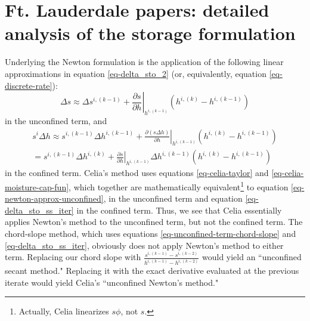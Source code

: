 \documentclass[fleqn]{article}
\begin{document}
\section{Ft. Lauderdale papers: detailed analysis of the storage formulation}
Underlying the Newton formulation is the application of the following linear approximations in equation \ref{eq-delta_sto_2} (or, equivalently,
equation \ref{eq-discrete-rate}):
\begin{equation}
  \Delta s \approx \Delta s^{i,(k-1)} +
  \left. \frac{\partial s}{\partial h}\right|_{h^{i,(k-1)}}
  \left ( h^{i,(k)} - h^{i,(k-1)} \right )
  \label{eq-newton-approx-unconfined}
\end{equation}
in the unconfined term, and
\begin{equation}
  \begin{split}
    s^{i} \Delta h \approx s^{i,(k-1)} \Delta h^{i,(k-1)} +
    \left. \frac{\partial \left ( s \Delta h \right )}{\partial h}\right|_{h^{i,(k-1)}}
    \left ( h^{i,(k)} - h^{i,(k-1)} \right )\\
    = s^{i,(k-1)} \Delta h^{i,(k)} +
    \left. \frac{\partial s}{\partial h}\right|_{h^{i,(k-1)}}
    \Delta h^{i,(k-1)} \left ( h^{i,(k)} - h^{i,(k-1)} \right )
  \end{split}
  \label{eq-newton-approx-confined}
\end{equation}
in the confined term. Celia's method uses equations \ref{eq-celia-taylor} and \ref{eq-celia-moisture-cap-fun}, which together are mathematically equivalent\footnote{{\color{purple}Actually, Celia linearizes $s \phi$, not $s$.}} to equation \ref{eq-newton-approx-unconfined}, in the unconfined term and equation \ref{eq-delta_sto_ss_iter} in the confined term. Thus, we see that Celia essentially applies Newton's method to the unconfined term, but not the confined term. The chord-slope method, which uses equations \ref{eq-unconfined-term-chord-slope} and \ref{eq-delta_sto_ss_iter}, obviously does not apply Newton's method to either term. Replacing our chord slope with $\frac{s^{i,(k-1)} - s^{i,(k-2)}}{h^{i,(k-1)} - h^{i,(k-2)}}$ would yield an ``unconfined secant method." Replacing it with the exact derivative evaluated at the previous iterate would yield Celia's ``unconfined Newton's method."
\end{document}
